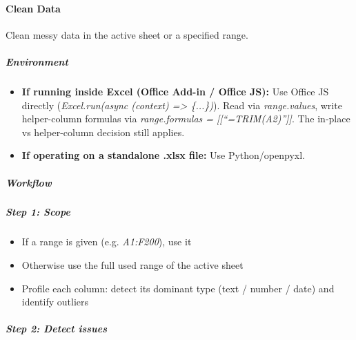 \documentclass[11pt]{article}
\begin{document}
\paragraph{Clean Data}\mbox{}\par

Clean messy data in the active sheet or a specified range.


\subparagraph{Environment}\mbox{}\par

\begin{itemize}[leftmargin=*,itemsep=2pt,topsep=2pt]
\item {} \textbf{If running inside Excel (Office Add-in / Office JS):} Use Office JS directly (\emph{Excel.run(async (context) => \{...\})}). Read via \emph{range.values}, write helper-column formulas via \emph{range.formulas = [[``=TRIM(A2)'']]}. The in-place vs helper-column decision still applies.
\item {} \textbf{If operating on a standalone .xlsx file:} Use Python/openpyxl.
\end{itemize}

\subparagraph{Workflow}\mbox{}\par

\subparagraph{Step 1: Scope}\mbox{}\par

\begin{itemize}[leftmargin=*,itemsep=2pt,topsep=2pt]
\item {} If a range is given (e.g. \emph{A1:F200}), use it
\item {} Otherwise use the full used range of the active sheet
\item {} Profile each column: detect its dominant type (text / number / date) and identify outliers
\end{itemize}

\subparagraph{Step 2: Detect issues}\mbox{}\par
\end{document}
